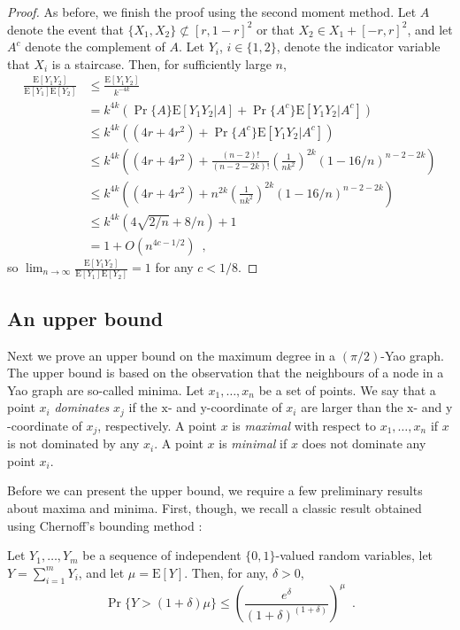 \documentclass[lotsofwhite,charterfonts]{patmorin}
\newcommand{\PROB}{\Pr}
\newcommand{\EXP}{\mathrm{E}}
\begin{document}
\begin{proof}
As before, we finish the proof using the second moment method.  Let $A$
denote the event that $\{X_1,X_2\}\not\subset[r,1-r]^2$ or that $X_2\in
X_1+[-r,r]^2$, and let $A^c$ denote the complement of $A$.  Let $Y_i$,
$i\in\{1,2\}$, denote the indicator variable that $X_i$ is a staircase.
Then, for sufficiently large $n$,
\[
  \begin{aligned}
    \frac{\EXP[Y_1Y_2]}{\EXP[Y_1]\EXP[Y_2]}
      & \le \frac{\EXP[Y_1Y_2]}{k^{-4k}} \\
      & = k^{4k} (\PROB\{A\}\EXP[Y_1Y_2|{A}]
             +\PROB\{A^c\}\EXP[Y_1Y_2|A^c]) \\
      & \le k^{4k} ((4r+4r^2) + \Pr\{A^c\}\EXP[Y_1Y_2|A^c]) \\
      & \le k^{4k} \left((4r+4r^2) + \frac{(n-2)!}{(n-2-2k)!}\left(\frac{1}{nk^2}\right)^{2k}(1-16/n)^{n-2-2k}\right) \\
      & \le k^{4k} \left((4r+4r^2) + n^{2k}\left(\frac{1}{nk^2}\right)^{2k}(1-16/n)^{n-2-2k}\right) \\
      & \le k^{4k}\left(4\sqrt{2/n}+ 8/n\right) + 1  \\
      & = 1 + O(n^{4c-1/2}) \enspace ,
  \end{aligned}
\]
so $\lim_{n\rightarrow\infty} \frac{\EXP[Y_1Y_2]}{\EXP[Y_1]\EXP[Y_2]} = 1$
for any $c<1/8$.
\end{proof}

\subsection{An upper bound}

Next we prove an upper bound on the maximum degree in a $(\pi/2)$-Yao graph.
The upper bound is based on the observation that the neighbours of a node
in a Yao graph are so-called minima.  Let $x_1,\ldots,x_n$ be a set of
points. We say that a point $x_i$ \emph{dominates} $x_j$ if the
$\mathrm{x}$- and $\mathrm{y}$-coordinate of $x_i$ are larger than the
$\mathrm{x}$- and $\mathrm{y}$-coordinate of $x_j$, respectively.  A point
$x$ is \emph{maximal} with respect to $x_1,\ldots,x_n$ if $x$ is not
dominated by any $x_i$.  A point $x$ is \emph{minimal} if $x$ does not
dominate any point $x_i$.

Before we can present the upper bound, we require a few preliminary results
about maxima and minima.  First, though, we recall a classic result 
obtained using Chernoff's bounding method \cite{c52}:

\begin{lem}
Let $Y_1,\ldots,Y_m$ be a sequence of independent $\{0,1\}$-valued
random variables, let $Y=\sum_{i=1}^m Y_i$, and let $\mu=\EXP[Y]$.
Then, for any, $\delta > 0$,
\[
   \Pr\{Y > (1+\delta)\mu\} 
     \le \left(\frac{e^{\delta}}{(1+\delta)^{(1+\delta)}}\right)^{\mu}
	\enspace .
\]
\end{lem}
\end{document}
